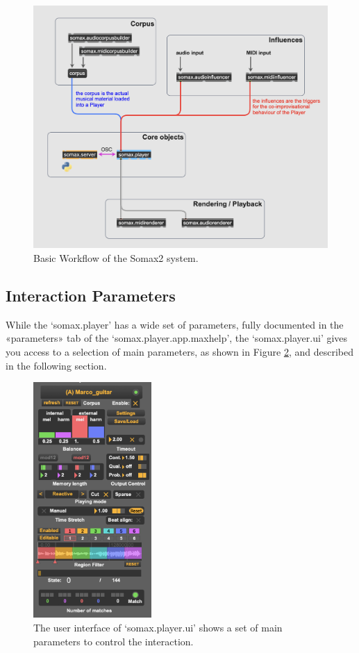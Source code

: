  \begin{figure}[h!]
    \centering        
 	\includegraphics[width=1\textwidth, keepaspectratio]{img/somax_workflow.png}
    \caption{Basic Workflow of the Somax2 system.}
    \label{fig:workflow}
\end{figure}


\subsection{Interaction Parameters}\label{sec:parameters}

While the `somax.player' has a wide set of parameters, fully documented in the «parameters» tab of the `somax.player.app.maxhelp', the `somax.player.ui' gives you access to a selection of main parameters, as shown in Figure \ref{fig:player_ui}, and described in the following section. 

 \begin{figure}[h]
    \centering        
 	\includegraphics[width=0.4\textwidth, trim=0 0 0 5, clip]{somax2-6-user-guide/img/player_compact_regions.png}
    \caption{The user interface of `somax.player.ui' shows a set of main parameters to control the interaction.}
    \label{fig:player_ui}
\end{figure}

